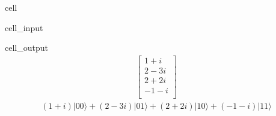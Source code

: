 \documentclass[letterpaper,10pt,english]{jupyterBook}
\begin{document}
\begin{sphinxuseclass}{cell}\begin{sphinxVerbatimInput}

\begin{sphinxuseclass}{cell_input}
\begin{sphinxVerbatim}[commandchars=\\\{\}]
   
\PYG{p}{[}\PYG{p}{[} \PYG{p}{]} \PYG{p}{[} \PYG{p}{]}\PYG{p}{[} \PYG{p}{]}\PYG{p}{[}\PYG{p}{]}\PYG{p}{]}

\end{sphinxVerbatim}

\end{sphinxuseclass}\end{sphinxVerbatimInput}
\begin{sphinxVerbatimOutput}

\begin{sphinxuseclass}{cell_output}\begin{equation*}
\begin{split}\begin{bmatrix}
1 + i  \\
 2 - 3 i  \\
 2 + 2 i  \\
 -1 - i  \\
 \end{bmatrix}
\end{split}
\end{equation*}\begin{equation*}
\begin{split}(1 + i) |00\rangle+(2 - 3 i) |01\rangle+(2 + 2 i) |10\rangle+(-1 - i) |11\rangle\end{split}
\end{equation*}
\end{sphinxuseclass}\end{sphinxVerbatimOutput}

\end{sphinxuseclass}
\end{document}
